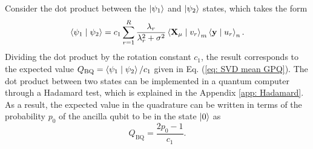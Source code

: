 \documentclass[10pt]{article}
\begin{document}
	Consider the dot product between the $\ket{\psi_1}$ and $\ket{\psi_2}$ states, which takes the form
	\begin{equation}
		\braket{\psi_1\mid\psi_2} = c_1\sum_{r=1}^{R}\frac{\lambda_{r}}{\lambda_{r}^{2}+\sigma^{2}} \braket{\mathbf{X_\mu} \mid v_{r}}_m\braket{\mathbf{y} \mid u_{r}}_n.
		\label{eq: mean QuantumHSQ}
	\end{equation}
	Dividing the dot product by the rotation constant $c_1$, the result corresponds to the expected value  $Q_{\mathrm{BQ}}= \braket{\psi_1\mid\psi_2}/c_1$ given in Eq. (\ref{eq: SVD mean GPQ}). The dot product between two states can be implemented in a quantum computer through a Hadamard test, which is explained in the Appendix \ref{app: Hadamard}. As a result, the expected value in the quadrature can be written in terms of the probability $p_0$ of the ancilla qubit to be in the state $\ket{0}$ as
	\begin{equation}
		Q_{\mathrm{BQ}}= \frac{2p_0 - 1}{c_1}.
	\end{equation}
	
\end{document}
